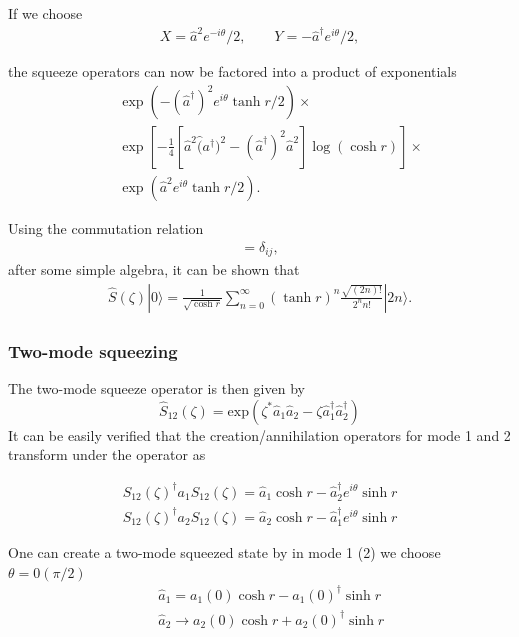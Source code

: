 \documentclass[pra,
superscriptaddress,
 amsmath,amssymb,
 aps,twocolumn]{revtex4-1}
\newcommand{\ket}[1]{|{#1}\rangle}
\begin{document}
\noindent If we choose
\begin{eqnarray}
X = \hat a ^2  e^{-i\theta}/2, \qquad
Y = -\hat a ^\dagger e^{i \theta} /2,
\end{eqnarray}

\noindent the squeeze operators can now be factored into a product of exponentials
\begin{eqnarray}
 &&\exp(-  (\hat a ^\dagger)^2  e^{ i \theta} \tanh r /2) \times\\
				  &&\exp[-\frac{1}{4}[\hat a^2 \hat (a^\dagger) ^2 - (\hat a ^\dagger) ^2 
				  \hat  a ^2] \log(\cosh r)] \times \nonumber \\
				  &&\exp(\hat a^2  e^{ i\theta} \tanh r/2 ). \nonumber 
\end{eqnarray}

\noindent Using the commutation relation
% 
\begin{eqnarray}
[a_i,a_j^\dagger] = \delta_{ij},
\end{eqnarray}
after some simple algebra, it can be shown that
\begin{eqnarray}
\hat S(\zeta)\ket{0} = \frac{1}{\sqrt{\cosh r}} \sum_{n=0}^\infty  (\tanh r)^n \frac{\sqrt{(2n)!}}{2^n n!}\ket{2n}.
\end{eqnarray}

\subsubsection{Two-mode squeezing}
The two-mode squeeze operator is then given by
\begin{equation}
\hat S_{12}(\zeta) = \text{exp} (\zeta^* \hat a_1 \hat a_2  - \zeta \hat a_1^\dagger \hat a_2 ^\dagger )
\end{equation}
\noindent
% 
% 
% 
It can be easily verified that the creation/annihilation operators for mode 1 and 2 transform under the operator as

\begin{eqnarray}
S_{12}(\zeta)^\dagger a_1 S_{12}(\zeta) = \hat a_1 \cosh r - \hat a_2^\dagger
e^{i \theta}\sinh r\\
S_{12}(\zeta)^\dagger a_2 S_{12}(\zeta) = \hat a_2 \cosh r - \hat a_1^\dagger
e^{i \theta}\sinh r
\end{eqnarray}


One can create a two-mode squeezed state by
in mode 1 (2) we choose $\theta=0 (\pi/2)$
\begin{eqnarray}
& &\hat a_1 = a_1(0) \cosh r - a_1(0)^\dagger \sinh r\\
% 
& &\hat a_2 \rightarrow a_2(0) \cosh r + a_2(0)^\dagger \sinh r \\
% 
\end{eqnarray}
\end{document}
